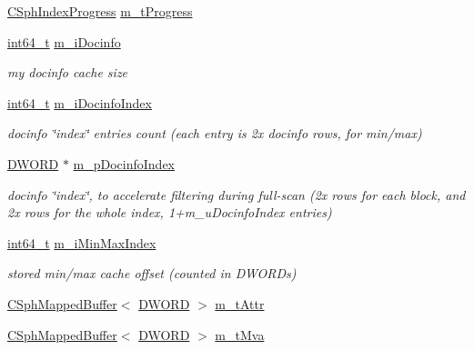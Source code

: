 \begin{DoxyCompactItemize}
\item 
\hyperlink{structCSphIndexProgress}{C\-Sph\-Index\-Progress} \hyperlink{classCSphIndex__VLN_ab3ba01819dc3d431b01eb46be7d04816}{m\-\_\-t\-Progress}
\item 
\hyperlink{sphinxstd_8h_a996e72f71b11a5bb8b3b7b6936b1516d}{int64\-\_\-t} \hyperlink{classCSphIndex__VLN_a21d49cfc99641fff1dfe6214a2d67ee0}{m\-\_\-i\-Docinfo}
\begin{DoxyCompactList}\small\item\em my docinfo cache size \end{DoxyCompactList}\item 
\hyperlink{sphinxstd_8h_a996e72f71b11a5bb8b3b7b6936b1516d}{int64\-\_\-t} \hyperlink{classCSphIndex__VLN_aeed3dd0d105f3b98cd96ab7fe597e36a}{m\-\_\-i\-Docinfo\-Index}
\begin{DoxyCompactList}\small\item\em docinfo \char`\"{}index\char`\"{} entries count (each entry is 2x docinfo rows, for min/max) \end{DoxyCompactList}\item 
\hyperlink{sphinxstd_8h_a798af1e30bc65f319c1a246cecf59e39}{D\-W\-O\-R\-D} $\ast$ \hyperlink{classCSphIndex__VLN_adb6dfe7998b4af88348e89493be91761}{m\-\_\-p\-Docinfo\-Index}
\begin{DoxyCompactList}\small\item\em docinfo \char`\"{}index\char`\"{}, to accelerate filtering during full-\/scan (2x rows for each block, and 2x rows for the whole index, 1+m\-\_\-u\-Docinfo\-Index entries) \end{DoxyCompactList}\item 
\hyperlink{sphinxstd_8h_a996e72f71b11a5bb8b3b7b6936b1516d}{int64\-\_\-t} \hyperlink{classCSphIndex__VLN_aa1885ec7b19c3cbcd980dc8a83765864}{m\-\_\-i\-Min\-Max\-Index}
\begin{DoxyCompactList}\small\item\em stored min/max cache offset (counted in D\-W\-O\-R\-Ds) \end{DoxyCompactList}\item 
\hyperlink{classCSphMappedBuffer}{C\-Sph\-Mapped\-Buffer}$<$ \hyperlink{sphinxstd_8h_a798af1e30bc65f319c1a246cecf59e39}{D\-W\-O\-R\-D} $>$ \hyperlink{classCSphIndex__VLN_a156a8c6fbcdd160b7158d6b5469442a7}{m\-\_\-t\-Attr}
\item 
\hyperlink{classCSphMappedBuffer}{C\-Sph\-Mapped\-Buffer}$<$ \hyperlink{sphinxstd_8h_a798af1e30bc65f319c1a246cecf59e39}{D\-W\-O\-R\-D} $>$ \hyperlink{classCSphIndex__VLN_acea5ffe949125ad0a33f619d1994e336}{m\-\_\-t\-Mva}

\end{DoxyCompactItemize}
